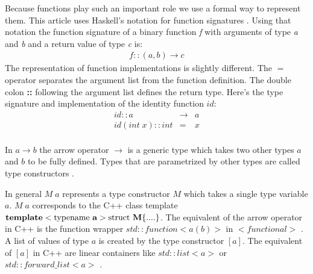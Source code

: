 \documentclass[12pt,fleqn]{article}
\begin{document}
Because functions play such an important role we use a formal way to represent them.
This article uses Haskell's notation for function signatures \cite{hutton}. 
Using that notation the function signature of
a binary function {\em f}  with arguments of type {\em a} and {\em b} and a return value of type {\em c} is:
\begin{eqnarray*}
                              f::(a,b) \rightarrow c
\end{eqnarray*}
The representation of function implementations is slightly different.
The $=$ operator separates the argument list from the function definition.  
The double colon {\bf ::} following the argument list defines the return type.
Here's the type signature and implementation of the identity function $id$:
\begin{eqnarray*}
id :: a &\rightarrow& a \\
id (int \; x)::int  &=& x  \\
\end{eqnarray*}

In $a \rightarrow b$ the arrow operator $\rightarrow$ is a generic type which takes two other types $a$ and $b$ to be fully defined.
Types that are parametrized by other types are called type constructors \cite{lipovaca}.

In general $M\;a$ represents a type constructor $M$ which takes a single type variable $a$.
$M\;a$ corresponds to the C++ class template  
$ {\bf template}<\mbox{typename {\bf a}}> \mbox{struct {\bf M}} \{....\}$. 
The equivalent of the arrow operator in C++ is the function wrapper $std::function<a(b)>$ in $<functional>$ \cite{josuttis, std::function}. 
A list of values of type $a$ is created by the type constructor $[a]$.
The equivalent of $[a]$ in C++ are linear containers like $std::list<a>$ or $std::forward\_list<a>$ \cite{josuttis}.



\end{document}
